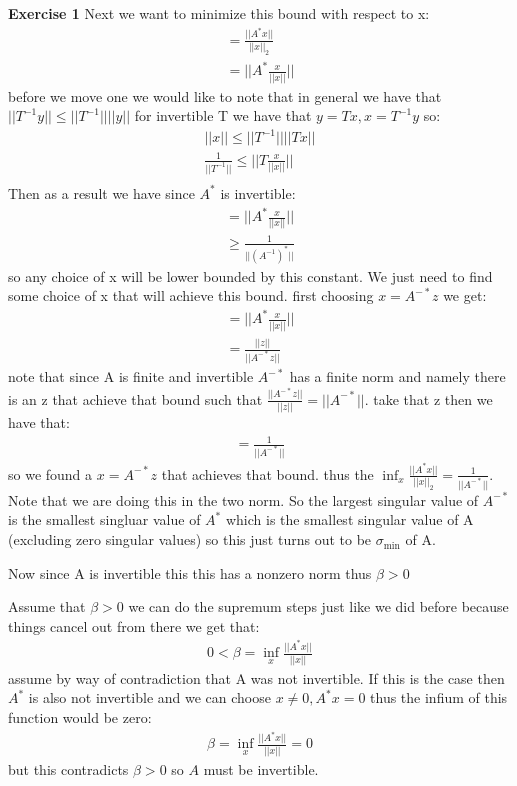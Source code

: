 \documentclass[12pt]{article}
\newenvironment{exercise}[1]{\vspace{.1in}\noindent\textbf{Exercise #1 \hspace{.05em}}}{}
\theoremstyle{definition}
\theoremstyle{remark}
\begin{document}
\begin{exercise}{1}
	Next we want to minimize this bound with respect to x:
	\begin{align}
		=\frac{||A^*x ||}{||x||_2} \\
		=||A^*\frac{x}{||x||}||
	\end{align}
	before we move one we would like to note that in general we have that $||T^{-1}y||\leq ||T^{-1}||||y||$ for invertible T we have that $y=Tx,x=T^{-1}y$ so:
	\begin{align}
		||x||\leq||T^{-1}||||Tx||                    \\
		\frac{1}{||T^{-1}||}\leq||T\frac{x}{||x||}|| \\
	\end{align}
	Then as a result we have since $A^*$ is invertible:
	\begin{align}
		=||A^*\frac{x}{||x||}|| \\
		\geq \frac{1}{||(A^{-1})^*||}
	\end{align}
	so any choice of x will be lower bounded by this constant. We just need to find some choice of x that will achieve this bound. first choosing $x= A^{-*}z$ we get:
	\begin{align}
		=||A^*\frac{x}{||x||}|| \\
		=\frac{||z||}{||A^{-*}z||}
	\end{align}
	note that since A is finite and invertible $A^{-*}$ has a finite norm and namely there is an z that achieve that bound such that $\frac{||A^{-*}z||}{||z||}=||A^{-*}||$. take that z then we have that:
	\begin{align}
		=\frac{1}{||A^{-*}||}
	\end{align}
	so we found a $x=A^{-*}z$ that achieves that bound. thus the $\inf_x\frac{||A^*x ||}{||x||_2}=\frac{1}{||A^{-*}||}$. Note that we are doing this in the two norm. So the largest singular value of $A^{-*}$ is the smallest singluar value of $A^*$ which is the smallest singular value of A (excluding zero singular values) so this just turns out to be $\sigma_\text{min}$ of A.

	Now since A is invertible this this has a nonzero norm thus $\beta>0$

	Assume that $\beta > 0$ we can do the supremum steps just like we did before because things cancel out from there we get that:
	\begin{align}
		0<\beta = \inf_x \frac{||A^*x||}{||x||}
	\end{align}
	assume by way of contradiction that A was not invertible. If this is the case then $A^{*}$ is also not invertible and we can choose $x\neq0, A^*x=0$ thus the infium of this function would be zero:
	\begin{align}
		\beta = \inf_x\frac{||A^*x||}{||x||}=0
	\end{align}
	but this contradicts $\beta>0$ so $A$ must be invertible.
\end{exercise}
\end{document}

